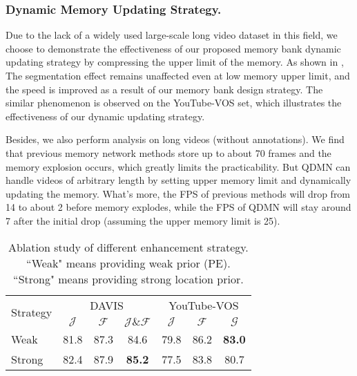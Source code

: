 \documentclass[runningheads]{llncs}
\begin{document}
    \subsubsection{Dynamic Memory Updating Strategy.} Due to the lack of a widely used large-scale long video dataset in this field, we choose to demonstrate the effectiveness of our proposed memory bank dynamic updating strategy by compressing the upper limit of the memory.
    As shown in , The segmentation effect remains unaffected even at low memory upper limit, and the speed is improved
    as a result of our memory bank design strategy.
    The similar phenomenon is observed on the YouTube-VOS set, which illustrates the effectiveness of our dynamic updating strategy.
    
    Besides, we also perform analysis on long videos (without annotations).
    We find that previous memory network 
    methods store up to about 70 frames and the memory explosion occurs, 
    which greatly limits the practicability. 
    But QDMN can handle videos of arbitrary length by setting upper memory limit and dynamically updating the memory.
What's more, the FPS of previous methods will drop from 14 to about 2 before memory explodes, while the FPS of QDMN will stay around 7 after the initial drop (assuming the upper memory limit is 25).
    
    \begin{wraptable}{r}{6cm}
    \centering
\caption{Ablation study of different enhancement strategy. 
    ``Weak" means providing weak prior (PE). 
    ``Strong" means providing strong location prior.}
    \label{table strategy}
\begin{tabular}{lcccccc}
    \toprule[1.5pt]
            
            \multirow{2}{*}{Strategy} &\multicolumn{3}{c}{DAVIS} &\multicolumn{3}{c}{YouTube-VOS}\\
\cmidrule(lr){2-4} \cmidrule(lr){5-7}
& $\mathcal{J}$  & $\mathcal{F}$  & $\mathcal{J}\&\mathcal{F}$  & $\mathcal{J}$  & $\mathcal{F}$  & $\mathcal{G}$\\
              \midrule
    
    Weak              & 81.8    & 87.3 & 84.6 & 79.8 & 86.2 & \textbf{83.0}    \\        \noalign{\smallskip} 
    Strong              & 82.4  & 87.9  &\textbf{85.2}   & 77.5 & 83.8 & 80.7 \\
    \bottomrule[1.5pt]
    \end{tabular}
    \end{wraptable}
    
\end{document}
